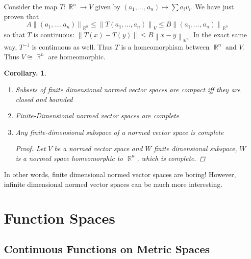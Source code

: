 \documentclass[11pt, a4paper]{memoir}
\DeclareMathOperator{\R}{{\mathbb{R}}}
\newcommand{\norm}[1]{\ensuremath{\left\lVert#1\right\rVert}}
\theoremstyle{change}
\newtheorem{corollary}[theorem]{Corollary.}
\theoremstyle{plain}
\theoremstyle{nonumberplain}
\newtheorem{proof}{Proof}
\numberwithin{equation}{section}
\begin{document}
Consider the map $T:\R^n\to V$ given by $(a_1,\ldots,a_n)\mapsto\sum a_iv_i$.
We have just proven that
\[A\norm{(a_1,\ldots,a_n)}_{\R^n}\leq\norm{T(a_1,\ldots,a_n)}_V\leq B\norm{(a_1,\ldots,a_n)}_{\R^n}\]
so that $T$ is continuous: $\norm{T(x)-T(y)}\leq B\norm{x-y}_{\R^n}$. In the exact same way, $T^{-1}$ is continuous as
well. Thus $T$ is a homeomorphism between $\R^n$ and $V$. Thus $V\cong\R^n$ are homeomorphic.
\begin{corollary}
    \begin{enumerate}
        \item Subsets of finite dimensional normed vector spaces are compact iff they are closed and bounded
        \item Finite-Dimensional normed vector spaces are complete
        \item Any finite-dimensional subspace of a normed vector space is complete
            \begin{proof}
                Let $V$ be a normed vector space and $W$ finite dimensional subspace, $W$ is a normed space homeomorphic
                to $\R^n$, which is complete.
            \end{proof}
    \end{enumerate}
\end{corollary}
In other words, finite dimensional normed vector spaces are boring! However, infinite dimensional normed vector spaces
can be much more interesting.
\chapter{Function Spaces}
\section{Continuous Functions on Metric Spaces}
\end{document}
